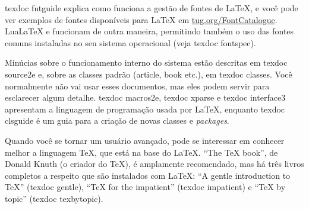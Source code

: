 \textsf{texdoc fntguide} explica como funciona a gestão de fontes de
\LaTeX{}, e você pode ver exemplos de fontes disponíveis para \LaTeX{}
em \url{tug.org/FontCatalogue}. Lua\LaTeX{} e \XeLaTeX{} funcionam de
outra maneira, permitindo também o uso das fontes comuns instaladas no
seu sistema operacional (veja \textsf{texdoc fontspec}).

Minúcias sobre o funcionamento interno do sistema estão descritas em
\textsf{texdoc source2e} e, sobre as classes padrão (\textsf{article, book}
etc.), em \textsf{texdoc classes}. Você normalmente não vai usar esses
documentos, mas eles podem servir para esclarecer algum detalhe.
\textsf{texdoc macros2e}, \textsf{texdoc xparse} e \textsf{texdoc
interface3} apresentam a linguagem de programação usada por \LaTeX{},
enquanto \textsf{texdoc clsguide} é um guia para a criação de novas
classes e \textit{packages}.

Quando você se tornar um usuário avançado, pode se interessar em conhecer
melhor a linguagem \TeX{}, que está na base do \LaTeX{}. ``The \TeX{} book'',
de Donald Knuth (o criador do \TeX), é amplamente recomendado, mas há três
livros completos a respeito que são instalados com \LaTeX{}: ``A gentle
introduction to \TeX{}'' (\textsf{texdoc gentle}), ``\TeX{} for the
impatient'' (\textsf{texdoc impatient}) e ``\TeX{} by topic'' (\textsf{texdoc
texbytopic}).
